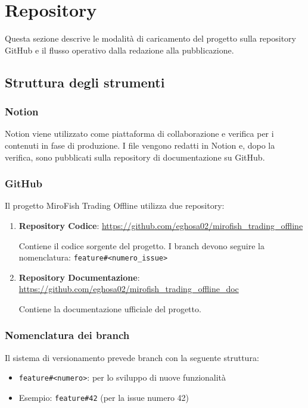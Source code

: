 \section{Repository}

Questa sezione descrive le modalità di caricamento del progetto sulla repository GitHub e il flusso operativo dalla redazione alla pubblicazione.

\subsection{Struttura degli strumenti}

\subsubsection{Notion}
Notion viene utilizzato come piattaforma di collaborazione e verifica per i contenuti in fase di produzione. I file vengono redatti in Notion e, dopo la verifica, sono pubblicati sulla repository di documentazione su GitHub.

\subsubsection{GitHub}
Il progetto MiroFish Trading Offline utilizza due repository:

\begin{enumerate}
  \item \textbf{Repository Codice}: \url{https://github.com/eghosa02/mirofish_trading_offline}
  
  Contiene il codice sorgente del progetto. I branch devono seguire la nomenclatura: \texttt{feature\#<numero\_issue>}
  
  \item \textbf{Repository Documentazione}: \url{https://github.com/eghosa02/mirofish_trading_offline_doc}
  
  Contiene la documentazione ufficiale del progetto.
\end{enumerate}

\subsubsection{Nomenclatura dei branch}
Il sistema di versionamento prevede branch con la seguente struttura:
\begin{itemize}
  \item \texttt{feature\#<numero>}: per lo sviluppo di nuove funzionalità
  \item Esempio: \texttt{feature\#42} (per la issue numero 42)
\end{itemize}

